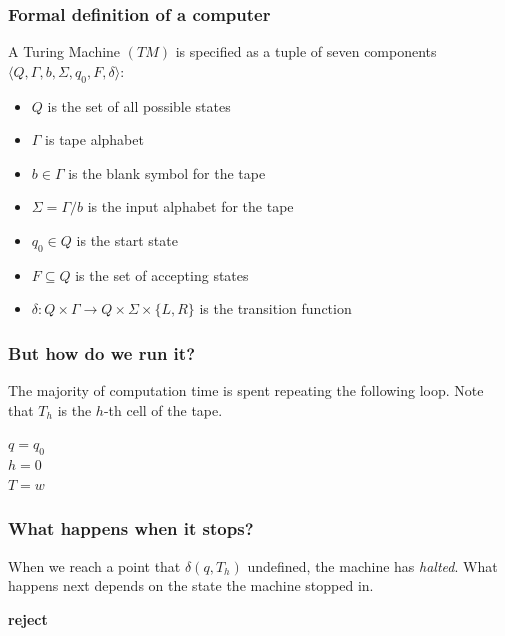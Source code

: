 \documentclass[aspectratio=169]{beamer}
\begin{document}
\begin{frame}
\frametitle{Formal definition of a computer}
A Turing Machine $(TM)$ is specified as a tuple of seven components $\langle Q, \Gamma, b, \Sigma, q_0, F, \delta \rangle$:

\begin{itemize}
	\item $Q$ is the set of all possible states
	\item $\Gamma$ is tape alphabet
	\item $b \in \Gamma$ is the blank symbol for the tape
	\item $\Sigma = \Gamma/b$ is the input alphabet for the tape
	\item $q_0 \in Q$ is the start state
	\item $F \subseteq Q$ is the set of accepting states
	\item $\delta: Q \times \Gamma \to Q \times \Sigma \times \{L, R\}$ is the transition function
\end{itemize}
\end{frame}

\begin{frame}
\frametitle{But how do we run it?}
The majority of computation time is spent repeating the following loop. Note that $T_h$ is the $h$-th cell of the tape.
\begin{algorithm}[H]
$q = q_0$\\
$h = 0$\\
$T = w$ 
\end{algorithm}
\end{frame}

\begin{frame}
\frametitle{What happens when it stops?}
When we reach a point that $\delta(q, T_h)$ undefined, the machine has {\em halted}. What happens next depends on the state the machine stopped in.
\begin{algorithm}[H]
{\bf{reject}}
\end{algorithm}
\end{frame}
\end{document}
